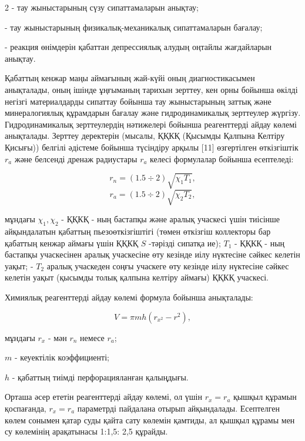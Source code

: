 \begin{multicols}{2}
- тау жыныстарының сүзу сипаттамаларын анықтау;

- тау жыныстарының физикалық-механикалық сипаттамаларын бағалау;

- реакция өнімдерін қабаттан депрессиялық алудың оңтайлы жағдайларын
анықтау.

Қабаттың кенжар маңы аймағының жай-күйі оның диагностикасымен
анықталады, оның ішінде ұңғыманың тарихын зерттеу, кен орны бойынша
өкілді негізгі материалдарды сипаттау бойынша тау жыныстарының заттық
және минералогиялық құрамдарын бағалау және гидродинамикалық
зерттеулер жүргізу. Гидродинамикалық зерттеулердің нәтижелері бойынша
реагенттерді айдау көлемі анықталады. Зерттеу деректерін (мысалы, ҚҚКҚ
(Қысымды Қалпына Келтіру Қисығы)) белгілі әдістеме бойынша түсіндіру
арқылы {[}11{]} өзгертілген өткізгіштік \(r_a\) және белсенді дренаж
радиустары \(r_a\) келесі формулалар бойынша есептеледі:

\begin{equation*}
r_n=(1.5\div 2)\sqrt{\chi_1T_1},
\end{equation*}
\vspace{-0.5cm}
\begin{equation*}
r_a=(1.5\div 2)\sqrt{\chi_2T_2},
\end{equation*}

мұндағы \(\chi_1,\chi_2\) - ҚҚКҚ - ның бастапқы және аралық учаскесі
үшін тиісінше айқындалатын қабаттың пьезоөткізгіштігі (төмен өткізгіш
коллекторы бар қабаттың кенжар аймағы үшін ҚҚКҚ \(S\) -тәрізді сипатқа
ие); \(T_1\) - ҚҚКҚ - ның бастапқы учаскесінен аралық учаскесіне өту
кезінде иілу нүктесіне сәйкес келетін уақыт; - \(T_2\) аралық
учаскеден соңғы учаскеге өту кезінде иілу нүктесіне сәйкес келетін
уақыт (қысымды толық қалпына келтіру аймағы) ҚҚКҚ учаскесі.

Химиялық реагенттерді айдау көлемі формула бойынша анықталады:

\begin{equation*}
V=\pi mh(r_{x^2}-r^2),
\end{equation*}

мұндағы \(r_x\) - мән \(r_n\) немесе \(r_a\);

\(m\) - кеуектілік коэффициенті;

\(h\) - қабаттың тиімді перфорацияланған қалыңдығы.

Орташа әсер ететін реагенттерді айдау көлемі, ол үшін \(r_x=r_a\)
қышқыл құрамын қоспағанда, \(r_x=r_a\) параметрді пайдалана отырып
айқындалады. Есептелген көлем сонымен қатар суды қайта сату көлемін
қамтиды, ал қышқыл құрамы мен су көлемінің арақатынасы 1:1,5: 2,5
құрайды.


\end{multicols}
